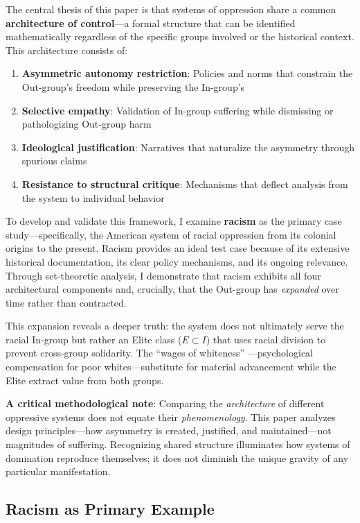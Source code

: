\documentclass[12pt]{article}
\begin{document}
The central thesis of this paper is that systems of oppression share a common \textbf{architecture of control}---a formal structure that can be identified mathematically regardless of the specific groups involved or the historical context. This architecture consists of:
\begin{enumerate}
    \item \textbf{Asymmetric autonomy restriction}: Policies and norms that constrain the Out-group's freedom while preserving the In-group's
    \item \textbf{Selective empathy}: Validation of In-group suffering while dismissing or pathologizing Out-group harm
    \item \textbf{Ideological justification}: Narratives that naturalize the asymmetry through spurious claims
    \item \textbf{Resistance to structural critique}: Mechanisms that deflect analysis from the system to individual behavior
\end{enumerate}

To develop and validate this framework, I examine \textbf{racism} as the primary case study---specifically, the American system of racial oppression from its colonial origins to the present. Racism provides an ideal test case because of its extensive historical documentation, its clear policy mechanisms, and its ongoing relevance. Through set-theoretic analysis, I demonstrate that racism exhibits all four architectural components and, crucially, that the Out-group has \textit{expanded} over time rather than contracted.

This expansion reveals a deeper truth: the system does not ultimately serve the racial In-group but rather an Elite class ($E \subset I$) that uses racial division to prevent cross-group solidarity. The ``wages of whiteness'' \cite{roediger, dubois}---psychological compensation for poor whites---substitute for material advancement while the Elite extract value from both groups.


\textbf{A critical methodological note}: Comparing the \textit{architecture} of different oppressive systems does not equate their \textit{phenomenology}. This paper analyzes design principles---how asymmetry is created, justified, and maintained---not magnitudes of suffering. Recognizing shared structure illuminates how systems of domination reproduce themselves; it does not diminish the unique gravity of any particular manifestation.

\subsection{Racism as Primary Example}
\end{document}
